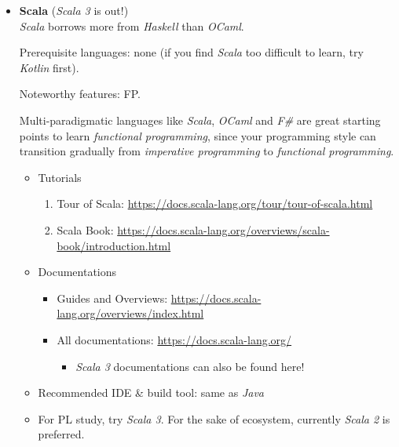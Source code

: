 \documentclass{article}
\begin{document}
\begin{itemize}
    \item \textbf{Scala} (\emph{Scala 3} is out!)\\
    
    \emph{Scala} borrows more from \emph{Haskell} than \emph{OCaml}.
    
    Prerequisite languages: none (if you find \emph{Scala} too difficult to learn, try \emph{Kotlin} first).
    
    Noteworthy features: FP.
    
    Multi-paradigmatic languages like \emph{Scala}, \emph{OCaml} and \emph{F\#} are great starting points to learn \emph{functional programming}, since your programming style can transition gradually from \emph{imperative programming} to \emph{functional programming}.
    \begin{itemize}
        \item Tutorials
        \begin{enumerate}
            \item Tour of Scala:
            \href{https://docs.scala-lang.org/tour/tour-of-scala.html}{https://docs.scala-lang.org/tour/tour-of-scala.html}
            \item Scala Book:
            \href{https://docs.scala-lang.org/overviews/scala-book/introduction.html}{https://docs.scala-lang.org/overviews/scala-book/introduction.html}

        \end{enumerate}
        \item Documentations
        \begin{itemize}
            \item Guides and Overviews:
            \href{https://docs.scala-lang.org/overviews/index.html}{https://docs.scala-lang.org/overviews/index.html}
            \item All documentations:
            \href{https://docs.scala-lang.org/}{https://docs.scala-lang.org/}
                \begin{itemize}
                    \item \emph{Scala 3} documentations can also be found here!
                \end{itemize}
        \end{itemize}
        \item Recommended IDE \& build tool: same as \emph{Java}
        \item For PL study, try \emph{Scala 3}.
        For the sake of ecosystem, currently \emph{Scala 2} is preferred.
        \end{itemize}
        

\end{itemize}
\end{document}
